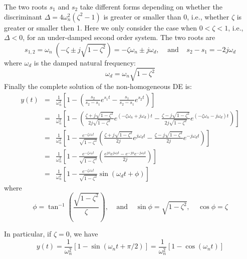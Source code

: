 \documentclass{article}
\begin{document}
The two roots $s_1$ and $s_2$ take different forms depending on 
whether the discriminant $\Delta=4\omega_n^2(\zeta^2-1)$ is greater
or smaller than 0, i.e., whether $\zeta$ is greater or smaller then 1.
Here we only consider the case when $0 < \zeta < 1$, i.e., $\Delta<0$,
for an under-damped second order system. The two roots are
\begin{equation}
  s_{1,2}=\omega_n \; (-\zeta\pm j\sqrt{1-\zeta^2})=-\zeta \omega_n\pm j\omega_d,
  \;\;\;\;\mbox{and}\;\;\;\;s_2-s_1=-2j\omega_d 
\end{equation}
where $\omega_d$ is the damped natural frequency:
\begin{equation}
  \omega_d=\omega_n \sqrt{1-\zeta^2} 
\end{equation}
Finally the complete solution of the non-homogeneous DE is:
\begin{eqnarray}
  y(t)&=&\frac{1}{\omega_n^2}\left[1-\left(\frac{s_2}{s_2-s_1}e^{s_1t}-\frac{s_1}{s_2-s_1}e^{s_2t}\right)\right]
  \nonumber \\
  &=&\frac{1}{\omega_n^2}\left[ 1-
    \left(\frac{\zeta+j\sqrt{1-\zeta^2}}{2j\sqrt{1-\zeta^2}} e^{(-\zeta\omega_n+j\omega_d)t} 
    -\frac{\zeta-j\sqrt{1-\zeta^2}}{2j\sqrt{1-\zeta^2}} e^{(-\zeta\omega_n-j\omega_d)t} \right) \right]
  \nonumber \\
  &=&\frac{1}{\omega_n^2}\left[ 1-\frac{e^{-\zeta\omega_nt}}{\sqrt{1-\zeta^2}}
    \left(\frac{\zeta+j\sqrt{1-\zeta^2}}{2j} e^{ j\omega_dt} 
    -\frac{\zeta-j\sqrt{1-\zeta^2}}{2j} e^{-j\omega_dt} \right) \right]
  \nonumber \\
  &=&\frac{1}{\omega_n^2}\left[ 1-\frac{e^{-\zeta\omega_nt}}{\sqrt{1-\zeta^2}}
    \left(\frac{ e^{j\phi} e^{ j\omega_dt}-e^{-j\phi} e^{-j\omega_dt} }{2j} \right) \right]
  \nonumber \\
  &=&\frac{1}{\omega_n^2}\left[1-\frac{e^{-\zeta\omega_nt}}{\sqrt{1-\zeta^2}}
    \sin(\omega_dt+\phi) \right]
\end{eqnarray}
where 
\begin{equation} 
  \phi=\tan^{-1}\left( \frac{\sqrt{1-\zeta^2}}{\zeta} \right),
  \;\;\;\;\mbox{and}\;\;\;\;
  \sin \phi=\sqrt{1-\zeta^2},\;\;\;\;\cos \phi=\zeta  
\end{equation}


In particular, if $\zeta=0$, we have
\begin{equation}
  y(t)=\frac{1}{\omega_n^2}\left[1-\sin(\omega_n t+\pi/2)\right]
  =\frac{1}{\omega_n^2}\left[1-\cos(\omega_n t)\right]
\end{equation}
\end{document}
